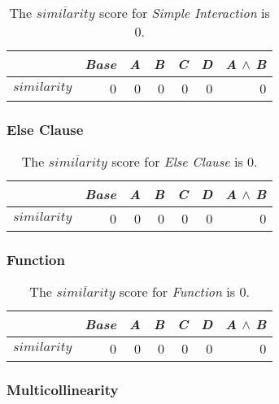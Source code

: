 \begin{table}[H]
    \centering
    \begin{tabular}{lrrrrrr}    \toprule
               & \emph{Base} & \emph{A} & \emph{B} & \emph{C} & \emph{D} & \emph{A} $\land$ \emph{B}   \\ \midrule
    $similarity$ & 0 & 0 & 0 & 0 & 0 & 0      \\ \bottomrule
    \end{tabular}
    \caption{The $\overline{similarity}$ score for \emph{Simple Interaction} is $0$.}
\end{table}

\subsubsection*{Else Clause}

\begin{table}[H]
    \centering
    \begin{tabular}{lrrrrrr}    \toprule
               & \emph{Base} & \emph{A} & \emph{B} & \emph{C} & \emph{D} & \emph{A} $\land$ \emph{B}   \\ \midrule
    $similarity$ & 0 & 0 & 0 & 0 & 0 & 0      \\ \bottomrule
    \end{tabular}
    \caption{The $\overline{similarity}$ score for \emph{Else Clause} is $0$.}
\end{table}

\subsubsection*{Function}

\begin{table}[H]
    \centering
    \begin{tabular}{lrrrrrr}    \toprule
               & \emph{Base} & \emph{A} & \emph{B} & \emph{C} & \emph{D} & \emph{A} $\land$ \emph{B}   \\ \midrule
    $similarity$ & 0 & 0 & 0 & 0 & 0 & 0      \\ \bottomrule
    \end{tabular}
    \caption{The $\overline{similarity}$ score for \emph{Function} is $0$.}
\end{table}
    
\subsubsection*{Multicollinearity}

